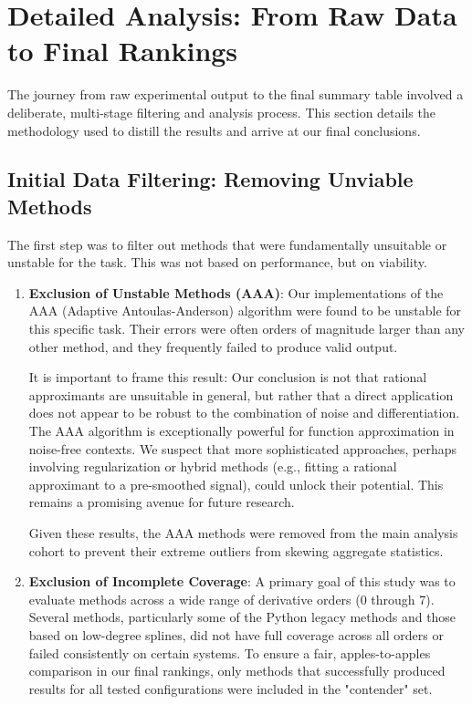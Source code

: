 \section{Detailed Analysis: From Raw Data to Final Rankings}
\label{sec:analysis}

The journey from raw experimental output to the final summary table involved a deliberate, multi-stage filtering and analysis process. This section details the methodology used to distill the results and arrive at our final conclusions.

\subsection{Initial Data Filtering: Removing Unviable Methods}
The first step was to filter out methods that were fundamentally unsuitable or unstable for the task. This was not based on performance, but on viability.

\begin{enumerate}
    \item \textbf{Exclusion of Unstable Methods (AAA)}: Our implementations of the AAA (Adaptive Antoulas-Anderson) algorithm were found to be unstable for this specific task. Their errors were often orders of magnitude larger than any other method, and they frequently failed to produce valid output.
    
    It is important to frame this result: Our conclusion is not that rational approximants are unsuitable in general, but rather that a direct application does not appear to be robust to the combination of noise and differentiation. The AAA algorithm is exceptionally powerful for function approximation in noise-free contexts. We suspect that more sophisticated approaches, perhaps involving regularization or hybrid methods (e.g., fitting a rational approximant to a pre-smoothed signal), could unlock their potential. This remains a promising avenue for future research.
    
    Given these results, the AAA methods were removed from the main analysis cohort to prevent their extreme outliers from skewing aggregate statistics.

    \item \textbf{Exclusion of Incomplete Coverage}: A primary goal of this study was to evaluate methods across a wide range of derivative orders (0 through 7). Several methods, particularly some of the Python legacy methods and those based on low-degree splines, did not have full coverage across all orders or failed consistently on certain systems. To ensure a fair, apples-to-apples comparison in our final rankings, only methods that successfully produced results for all tested configurations were included in the "contender" set.
\end{enumerate}


